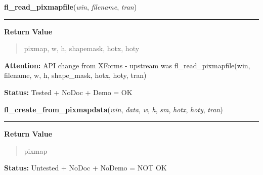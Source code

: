 \hspace{.8\funcindent}\begin{boxedminipage}{\funcwidth}

    \raggedright \textbf{fl\_read\_pixmapfile}(\textit{win}, \textit{filename}, \textit{tran})

    \vspace{-1.5ex}

    \rule{\textwidth}{0.5\fboxrule}
\setlength{\parskip}{2ex}
\setlength{\parskip}{1ex}
      \textbf{Return Value}
    \vspace{-1ex}

      \begin{quote}
      pixmap, w, h, shapemask, hotx, hoty

      \end{quote}

\textbf{Attention:} API change from XForms - upstream was fl\_read\_pixmapfile(win, filename, 
w, h, shape\_mask, hotx, hoty, tran)



\textbf{Status:} Tested + NoDoc + Demo = OK



    \end{boxedminipage}

    \label{xformslib:library:fl_create_from_pixmapdata}

    \vspace{0.5ex}

\hspace{.8\funcindent}\begin{boxedminipage}{\funcwidth}

    \raggedright \textbf{fl\_create\_from\_pixmapdata}(\textit{win}, \textit{data}, \textit{w}, \textit{h}, \textit{sm}, \textit{hotx}, \textit{hoty}, \textit{tran})

    \vspace{-1.5ex}

    \rule{\textwidth}{0.5\fboxrule}
\setlength{\parskip}{2ex}
\setlength{\parskip}{1ex}
      \textbf{Return Value}
    \vspace{-1ex}

      \begin{quote}
      pixmap

      \end{quote}

\textbf{Status:} Untested + NoDoc + NoDemo = NOT OK



    \end{boxedminipage}

